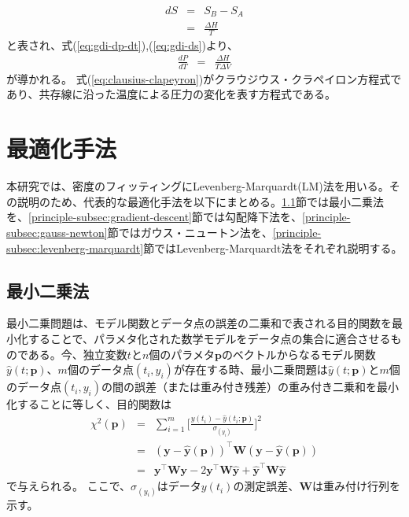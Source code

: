 \documentclass[titlepage]{jsreport}
\begin{document}
\large
\begin{eqnarray}
dS &=& S_B-S_A \nonumber \\
   &=& \frac{\Delta{H}}{T} \label{eq:gdi-ds}
\end{eqnarray}
\normalsize
と表され、式(\ref{eq:gdi-dp-dt}),(\ref{eq:gdi-ds})より、
\large
\begin{eqnarray}
\frac{dP}{dT} &=& \frac{\Delta{H}}{T\Delta{V}} \label{eq:clausius-clapeyron}
\end{eqnarray}
\normalsize
が導かれる。
式(\ref{eq:clausius-clapeyron})がクラウジウス・クラペイロン方程式であり、共存線に沿った温度による圧力の変化を表す方程式である\cite{atkins, clausius-clapeyron1}。


\section{最適化手法}\label{principle-sec:optimization-method}
本研究では、密度のフィッティングにLevenberg-Marquardt(LM)法を用いる。その説明のため、代表的な最適化手法を以下にまとめる。\ref{principle-subsec:least-squares}節では最小二乗法を、\ref{principle-subsec:gradient-descent}節では勾配降下法を、\ref{principle-subsec:gauss-newton}節ではガウス・ニュートン法を、\ref{principle-subsec:levenberg-marquardt}節ではLevenberg-Marquardt法をそれぞれ説明する。

\subsection{最小二乗法}\label{principle-subsec:least-squares}
最小二乗問題は、モデル関数とデータ点の誤差の二乗和で表される目的関数を最小化することで、パラメタ化された数学モデルをデータ点の集合に適合させるものである。今、独立変数$t$と$n$個のパラメタ$\bm{p}$のベクトルからなるモデル関数$\hat{y}(t;\bm{p})$、$m$個のデータ点$(t_i, y_i)$が存在する時、最小二乗問題は$\hat{y}(t;\bm{p})$と$m$個のデータ点$(t_i, y_i)$の間の誤差（または重み付き残差）の重み付き二乗和を最小化することに等しく、目的関数は
\large
\begin{eqnarray}
\chi^2(\bm{p}) &=& \sum_{i=1}^{m}\Bigg[\frac{y(t_i)-\hat{y}(t_i;\bm{p})}{\sigma_(y_i)}\Bigg]^2 \nonumber\\
               &=& (\bm{y}-\hat{\bm{y}}(\bm{p}))^\top\bm{W}(\bm{y}-\hat{\bm{y}}(\bm{p})) \nonumber\\
               &=& \bm{y}^\top\bm{W}\bm{y}-2\bm{y}^\top\bm{W}\hat{\bm{y}}+\hat{\bm{y}}^\top\bm{W}\hat{\bm{y}} \label{eq:queue-residual-error}
\end{eqnarray}
\normalsize
で与えられる。
ここで、$\sigma_(y_i)$はデータ$y(t_i)$の測定誤差、$\bm{W}$は重み付け行列を示す\cite{gradient-descent_gauss-newton_levenberg-marquardt}。
\end{document}
